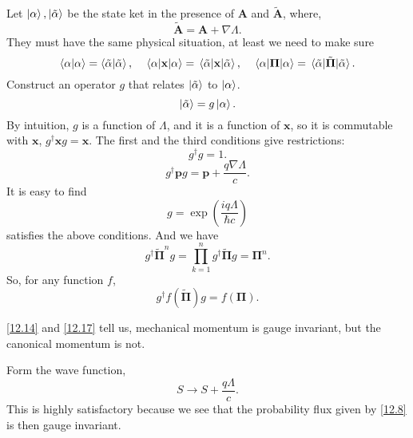 \documentclass{article}
\theoremstyle{1}
\begin{document}
Let $\ket{\alpha},\ket{\tilde{\alpha}}$ be the state ket in the presence of $\mathbf{A}$ and $\tilde{\mathbf{A}}$, where,
\begin{equation}
    \tilde{\mathbf{A}}=\mathbf{A}+\nabla \Lambda.
\end{equation}
They must have the same physical situation, at least we need to make sure
\begin{equation}
   \braket{\alpha}=\braket{\tilde{\alpha}} ,\quad \expval{\mathbf{x}}{\alpha}=\expval{\mathbf{x}}{\tilde{\alpha}},\quad \expval{\mathbf{\Pi}}{\alpha}=\expval{\tilde{\mathbf{\Pi}}}{\tilde{\alpha}}.
\end{equation}
Construct an operator $g$ that relates $\ket{\tilde{\alpha}}$ to $\ket{\alpha}$.
\begin{equation}
    \ket{\tilde{\alpha}}=g\ket{\alpha}.
\end{equation}
By intuition, $g$ is a function of $\Lambda$, and it is a function of $\mathbf{x}$, so it is commutable with $\mathbf{x}$, $g^\dagger\mathbf{x} g=\mathbf{x}$. The first and the third conditions give restrictions:
\begin{equation}
    g^\dagger g=1.
\end{equation}
    \begin{equation}\label{12.14}
    g^\dagger \mathbf{p}g=\mathbf{p}+\frac{q\nabla\Lambda}{c}.
\end{equation}
It is easy to find 
\begin{equation}
    g=\exp\left(\frac{iq\Lambda}{\hbar c}\right)
\end{equation}
satisfies the above conditions. And we have 
\begin{equation}
    g^\dagger \tilde{\mathbf{\Pi}}^ng=\prod_{k=1}^{n}g^\dagger \tilde{\mathbf{\Pi}}g=\mathbf{\Pi}^n.
\end{equation}
So, for any function $f$,
\begin{equation}\label{12.17}
    g^\dagger f\left(\tilde{\mathbf{\Pi}}\right) g=f\left(\mathbf{\Pi}\right).
\end{equation}

\eqref{12.14} and \eqref{12.17} tell us, mechanical momentum is gauge invariant, but the canonical momentum is not.

Form the wave function, 
\begin{equation}
    S\longrightarrow S+\frac{q\Lambda}{c}.
\end{equation}
This is highly satisfactory because we see that the probability flux given by \eqref{12.8} is then gauge invariant. 
\end{document}
